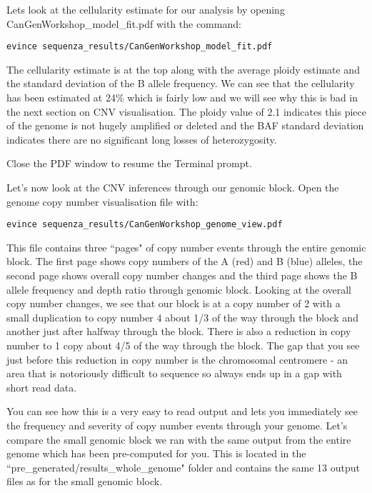 \begin{steps}
Lets look at the cellularity estimate for our analysis by opening CanGenWorkshop\_model\_fit.pdf with the command:
\begin{lstlisting}
evince sequenza_results/CanGenWorkshop_model_fit.pdf
\end{lstlisting}
\end{steps}

The cellularity estimate is at the top along with the average ploidy estimate and the standard deviation of the B allele frequency. We can see that the cellularity has been estimated at 24\% which is fairly low and we will see why this is bad in the next section on CNV visualisation. The ploidy value of 2.1 indicates this piece of the genome is not hugely amplified or deleted and the BAF standard deviation indicates there are no significant long losses of heterozygosity.

Close the PDF window to resume the Terminal prompt.\\

\begin{steps}
Let's now look at the CNV inferences through our genomic block. Open the genome copy number visualisation file with:
\begin{lstlisting}
evince sequenza_results/CanGenWorkshop_genome_view.pdf
\end{lstlisting}
\end{steps}

This file contains three ``pages" of copy number events through the entire genomic block. The first page shows copy numbers of the A (red) and B (blue) alleles, the second page shows overall copy number changes and the third page shows the B allele frequency and depth ratio through genomic block. Looking at the overall copy number changes, we see that our block is at a copy number of 2 with a small duplication to copy number 4 about 1/3 of the way through the block and another just after halfway through the block. There is also a reduction in copy number to 1 copy about 4/5 of the way through the block. The gap that you see just before this reduction in copy number is the chromosomal centromere - an area that is notoriously difficult to sequence so always ends up in a gap with short read data.

You can see how this is a very easy to read output and lets you immediately see the frequency and severity of copy number events through your genome. Let's compare the small genomic block we ran with the same output from the entire genome which has been pre-computed for you. This is located in the ``pre\_generated/results\_whole\_genome" folder and contains the same 13 output files as for the small genomic block.\\

